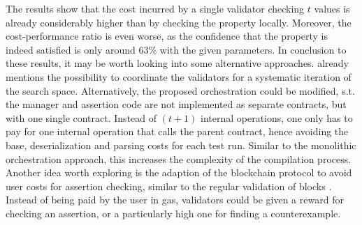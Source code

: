 The results show that the cost incurred by a single validator checking $t$ values is already considerably higher than by checking the property locally. Moreover, the cost-performance ratio is even worse, as the confidence that the property is indeed satisfied is only around 63\% with the given parameters. In conclusion to these results, it may be worth looking into some alternative approaches.  already mentions the possibility to coordinate the validators for a systematic iteration of the search space. Alternatively, the proposed orchestration could be modified, s.t. the manager and assertion code are not implemented as separate contracts, but with one single contract. Instead of $(t+1)$ internal operations, one only has to pay for one internal operation that calls the parent contract, hence avoiding the base, deserialization and parsing costs for each test run. Similar to the monolithic orchestration approach, this increases the complexity of the compilation process.\\ Another idea worth exploring is the adaption of the blockchain protocol to avoid user costs for assertion checking, similar to the regular validation of blocks \cite{tezos_docs}. Instead of being paid by the user in gas, validators could be given a reward for checking an assertion, or a particularly high one for finding a counterexample. 


